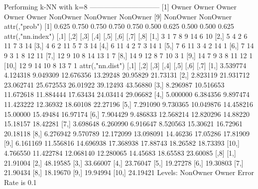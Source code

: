 \documentclass{article}
\begin{document}
\begin{Schunk}
\begin{Soutput}
Performing k-NN with k=8
 ------------------------------
 [1] Owner    Owner    Owner    Owner    Owner    NonOwner NonOwner NonOwner
 [9] NonOwner NonOwner
attr(,"prob")
 [1] 0.625 0.750 0.750 0.750 0.750 0.500 0.625 0.500 0.500 0.625
attr(,"nn.index")
      [,1] [,2] [,3] [,4] [,5] [,6] [,7] [,8]
 [1,]    3    1    7    8    9   14    6   10
 [2,]    5    4    2    6   11    7    3   14
 [3,]    4    6    2   11    5    7    3   14
 [4,]    6   11    4    2    7    3   14    1
 [5,]    7    6   11    3    4    2   14    1
 [6,]    7   14    9    3    1    8   12   11
 [7,]   12    9   10    8   14   13    1    7
 [8,]   14    9   12    8    7   10    3    1
 [9,]   14    7    9    3    8   11   12    1
[10,]   12    9   14   10    8   13    7    1
attr(,"nn.dist")
          [,1]      [,2]      [,3]      [,4]     [,5]     [,6]     [,7]
 [1,] 3.539774  4.124318  9.049309 12.676356 13.29248 20.95829 21.73131
 [2,] 2.823119 21.931712 23.062741 25.672553 26.01922 39.12493 43.56880
 [3,] 8.296987 10.516653 11.672618 11.884444 17.63434 24.03414 29.06682
 [4,] 5.000000  6.384356  9.897474 11.423222 12.36932 18.60108 22.27196
 [5,] 7.291090  9.730365 10.049876 14.458216 15.00000 15.49484 16.97174
 [6,] 7.904429  9.486833 12.568214 12.820296 14.88220 15.18157 18.42281
 [7,] 3.698648  6.260990  6.916647  8.520563 15.30621 16.72961 20.18118
 [8,] 6.276942  9.570789 12.172099 13.098091 14.46236 17.05286 17.81909
 [9,] 6.161169 11.556816 14.696938 17.368938 17.88743 18.26582 18.73393
[10,] 4.766550 11.422784 12.068140 12.280065 14.45683 18.65583 23.60085
          [,8]
 [1,] 21.91004
 [2,] 48.19585
 [3,] 33.66007
 [4,] 23.76047
 [5,] 19.27278
 [6,] 19.30803
 [7,] 21.90434
 [8,] 18.19670
 [9,] 19.94994
[10,] 24.19421
Levels: NonOwner Owner
Error Rate is  0.1


\end{Soutput}
\end{Schunk}
\end{document}
